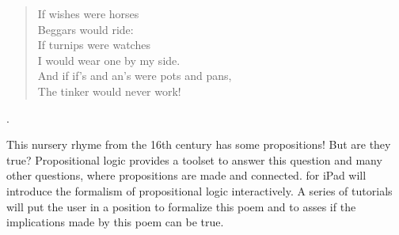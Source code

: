 


\begin{minipage}[t]{180mm}
\begin{verse}
If wishes were horses \\
Beggars would ride: \\
If turnips were watches \\
I would wear one by my side. \\
And if if's and an's were pots and pans, \\
The tinker would never work!
\end{verse}.
\end{minipage}

This nursery rhyme from the 16th century has some propositions! But are they true? 
Propositional logic provides a toolset to answer this question and many other questions,
where propositions are made and connected. 
\Nyaya for iPad
will introduce the formalism of propositional logic interactively.
A series of tutorials will put the user in a position
to formalize this poem
and to asses if the implications made by this poem can be true.
